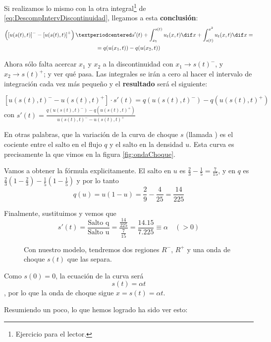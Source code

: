 		Si realizamos lo mismo con la otra integral\footnote{Ejercicio para el lector.} de \eqref{eq:DescompIntervDiscontinuidad}, llegamos a esta \textbf{conclusión}:
		\begin{multline*}
		\left(\left[u(s(t),t)\right]^{-} - \left[u(s(t),t)\right]^{+}\right)· s'(t) + \int^{s(t)}_{x_1} u_t(x,t) \dif x + \int^{x^2}_{s(t)} u_t(x,t) \dif x = \\ = q(u(x_1,t)) - q(u(x_2,t))
		\end{multline*}

		Ahora sólo falta acercar $x_1$ y $x_2$ a la discontinuidad con $x_1 \to s(t)^{-}$, y $x_2 \to s(t)^{+}$; y ver qué pasa. Las integrales se irán a cero al hacer el intervalo de integración cada vez más pequeño y el \textbf{resultado} será el siguiente:

		\[ \left[ u(s(t),t)^{-} - u(s(t),t)^{+} \right] · s'(t) = q(u(s(t),t)^{-}) - q(u(s(t),t)^{+}) \] con
		\( s'(t) = \frac{q(u(s(t),t)^{-}) - q(u(s(t),t)^{+})}{u(s(t),t)^{-} - u(s(t),t)^{+}} \label{eq:DerivadaOndaChoque} \)

		En otras palabras, que la variación de la curva de choque $s$ (llamada ) es el cociente entre el salto en el flujo $q$ y el salto en la densidad $u$. Esta curva es precisamente la que vimos en la figura \ref{fig:ondaChoque}.

		Vamos a obtener la fórmula explicitamente. El salto en $u$ es $\frac{2}{3} - \frac{1}{5} = \frac{7}{15}$, y en $q$ es $\frac{2}{3} (1-\frac{2}{3}) - \frac{1}{5}(1-\frac{1}{5})$ y por lo tanto
		\[ q(u) = u (1-u) = \frac{2}{9} - \frac{4}{25} = \frac{14}{225} \]

		Finalmente, sustituimos y vemos que \[
		s'(t) = \frac{\text{Salto q}}{\text{Salto u}} = \frac{\frac{14}{225}}{\frac{7}{15}} = \frac{14.15}{7.225} \equiv \alpha \quad(>0) \]

		\begin{wrapfigure}[10]{R}{0.4\textwidth}
			\centering
			\vspace{-15pt}
			\vspace{-10pt}
			\caption{Con nuestro modelo, tendremos dos regiones $R^-$, $R^+$ y una onda de choque $s(t)$ que las separa.}
			\label{fig:OndaChoqueRPM}
		\end{wrapfigure}

		Como $s(0) = 0$, la ecuación de la curva será \[
		s(t) = \alpha t \],
		por lo que la onda de choque sigue $x = s(t) = \alpha t$.

			Resumiendo un poco, lo que hemos logrado ha sido ver esto:

